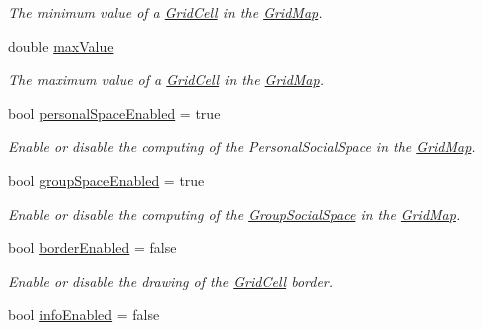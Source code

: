 \begin{DoxyCompactItemize}
\begin{DoxyCompactList}\small\item\em The minimum value of a \hyperlink{classGridCell}{Grid\+Cell} in the \hyperlink{classGridMap}{Grid\+Map}. \end{DoxyCompactList}\item 
double \hyperlink{classGridMap_a275bf52aba3335c8fa35d9c57e177dd9}{max\+Value}\hypertarget{classGridMap_a275bf52aba3335c8fa35d9c57e177dd9}{}\label{classGridMap_a275bf52aba3335c8fa35d9c57e177dd9}

\begin{DoxyCompactList}\small\item\em The maximum value of a \hyperlink{classGridCell}{Grid\+Cell} in the \hyperlink{classGridMap}{Grid\+Map}. \end{DoxyCompactList}\item 
bool \hyperlink{classGridMap_ab61a1f66414c31e4ffdd15cbd8c2f373}{personal\+Space\+Enabled} = true\hypertarget{classGridMap_ab61a1f66414c31e4ffdd15cbd8c2f373}{}\label{classGridMap_ab61a1f66414c31e4ffdd15cbd8c2f373}

\begin{DoxyCompactList}\small\item\em Enable or disable the computing of the Personal\+Social\+Space in the \hyperlink{classGridMap}{Grid\+Map}. \end{DoxyCompactList}\item 
bool \hyperlink{classGridMap_ace7258ad25fea48c37b88e7de9c0b1b4}{group\+Space\+Enabled} = true\hypertarget{classGridMap_ace7258ad25fea48c37b88e7de9c0b1b4}{}\label{classGridMap_ace7258ad25fea48c37b88e7de9c0b1b4}

\begin{DoxyCompactList}\small\item\em Enable or disable the computing of the \hyperlink{classGroupSocialSpace}{Group\+Social\+Space} in the \hyperlink{classGridMap}{Grid\+Map}. \end{DoxyCompactList}\item 
bool \hyperlink{classGridMap_aad72652fe3a6ab78b47bce0c0daaaab5}{border\+Enabled} = false\hypertarget{classGridMap_aad72652fe3a6ab78b47bce0c0daaaab5}{}\label{classGridMap_aad72652fe3a6ab78b47bce0c0daaaab5}

\begin{DoxyCompactList}\small\item\em Enable or disable the drawing of the \hyperlink{classGridCell}{Grid\+Cell} border. \end{DoxyCompactList}\item 
bool \hyperlink{classGridMap_ab106fa68828f14f788e697728b94992b}{info\+Enabled} = false\hypertarget{classGridMap_ab106fa68828f14f788e697728b94992b}{}\label{classGridMap_ab106fa68828f14f788e697728b94992b}


\end{DoxyCompactItemize}
